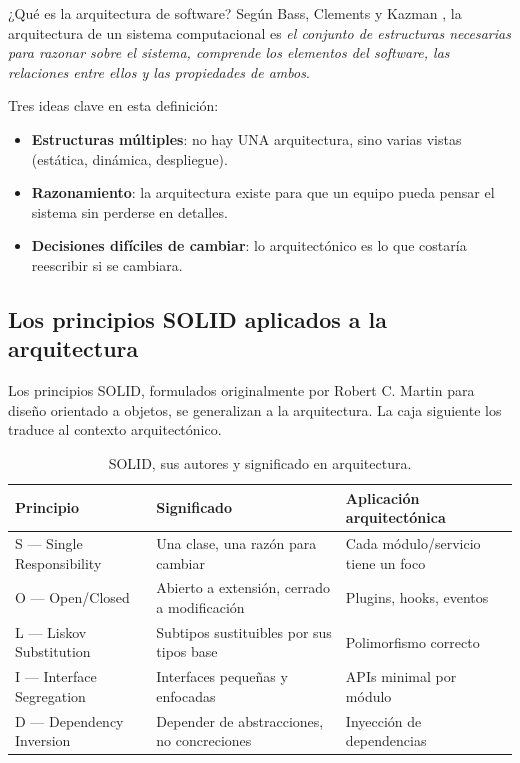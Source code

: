 \documentclass[11pt,a4paper,openany]{book}
\begin{document}
\begin{cajadefinicion}{¿Qué es la arquitectura de software?}
Según Bass, Clements y Kazman \cite{bass2021software}, la arquitectura
de un sistema computacional es \emph{el conjunto de estructuras
necesarias para razonar sobre el sistema, comprende los elementos del
software, las relaciones entre ellos y las propiedades de ambos}.

Tres ideas clave en esta definición:
\begin{itemize}
\item \textbf{Estructuras múltiples}: no hay UNA arquitectura, sino
varias vistas (estática, dinámica, despliegue).
\item \textbf{Razonamiento}: la arquitectura existe para que un
equipo pueda pensar el sistema sin perderse en detalles.
\item \textbf{Decisiones difíciles de cambiar}: lo arquitectónico es
lo que costaría reescribir si se cambiara.
\end{itemize}
\end{cajadefinicion}

\subsection{Los principios SOLID aplicados a la arquitectura}

Los principios SOLID, formulados originalmente por Robert C.
Martin para diseño orientado a objetos, se generalizan a la
arquitectura. La caja siguiente los traduce al contexto
arquitectónico.


\begin{table}[htbp]
\centering
\caption{SOLID, sus autores y significado en arquitectura.}
\footnotesize
\begin{tabularx}{\textwidth}{lXX}
\toprule
\textbf{Principio} & \textbf{Significado} & \textbf{Aplicación arquitectónica}\\
\midrule
S --- Single Responsibility & Una clase, una razón para cambiar & Cada módulo/servicio tiene un foco\\
O --- Open/Closed & Abierto a extensión, cerrado a modificación & Plugins, hooks, eventos\\
L --- Liskov Substitution & Subtipos sustituibles por sus tipos base & Polimorfismo correcto\\
I --- Interface Segregation & Interfaces pequeñas y enfocadas & APIs minimal por módulo\\
D --- Dependency Inversion & Depender de abstracciones, no concreciones & Inyección de dependencias\\
\bottomrule
\end{tabularx}
\end{table}
\end{document}
